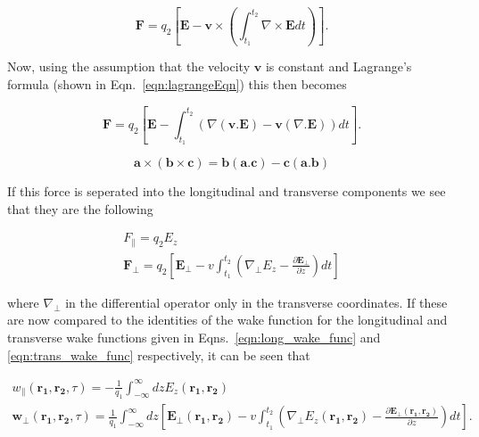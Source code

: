 \begin{equation}
\mathbf{F} = q_{2}  \left[\mathbf{E} - \mathbf{v}\times\left(  \int^{t_{2}}_{t_{1}} \nabla \times \mathbf{E} dt \right) \right].
\end{equation}

Now, using the assumption that the velocity $\mathbf{v}$ is constant and Lagrange's formula (shown in Eqn.~\ref{eqn:lagrangeEqn}) this then becomes

\begin{equation}
\mathbf{F} = q_{2}  \left[\mathbf{E} - \int^{t_{2}}_{t_{1}}\left(  \nabla \left( \mathbf{v} . \mathbf{E} \right)  - \mathbf{v}\left( \nabla . \mathbf{E} \right) \right) dt  \right].
\end{equation}

\begin{equation}
\mathbf{a} \times \left( \mathbf{b} \times \mathbf{c} \right) = \mathbf{b} \left( \mathbf{a}.\mathbf{c} \right) - \mathbf{c}\left( \mathbf{a}.\mathbf{b} \right)
\label{eqn:lagrangeEqn}
\end{equation}

If this force is seperated into the longitudinal and transverse components we see that they are the following

\begin{align}
F_{\parallel} = q_{2} E_{z} \\
\mathbf{F}_{\perp} = q_{2}  \left[\mathbf{E_{\perp}} - v \int^{t_{2}}_{t_{1}}\left(  \nabla_{\perp}E_{z}  - \frac{\partial\mathbf{E}_{\perp}}{\partial z} \right) dt  \right]
\end{align}

where $\nabla_{\perp}$ in the differential operator only in the transverse coordinates. If these are now compared to the identities of the wake function for the longitudinal and transverse wake functions given in Eqns.~\ref{eqn:long_wake_func} and \ref{eqn:trans_wake_func} respectively, it can be seen that

\begin{align}
w_{\parallel}\left( \mathbf{r_{1}}, \mathbf{r_{2}}, \tau   \right) = -\frac{1}{q_{1}} \int^{\infty}_{-\infty} dz E_{z} \left( \mathbf{r_{1}}, \mathbf{r_{2}} \right) \\
\mathbf{w}_{\perp} \left(\mathbf{r_{1}}, \mathbf{r_{2}}, \tau   \right) = \frac{1}{q_{1}} \int^{\infty}_{-\infty} dz \left[ \mathbf{E_{\perp}}\left(\mathbf{r_{1}}, \mathbf{r_{2}} \right) - v   \int^{t_{2}}_{t_{1}}\left(  \nabla_{\perp}E_{z}\left(\mathbf{r_{1}}, \mathbf{r_{2}} \right)  - \frac{\partial\mathbf{E}_{\perp}\left(\mathbf{r_{1}}, \mathbf{r_{2}} \right)}{\partial z} \right) dt \right] \label{eqn:trans_wake_middle}.
\end{align}

